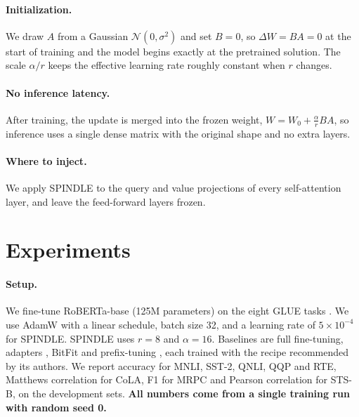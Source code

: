 \documentclass[10pt]{article}
\begin{document}
\paragraph{Initialization.} We draw $A$ from a Gaussian $\mathcal{N}(0, \sigma^2)$ and set $B = 0$, so $\Delta W = BA = 0$ at the start of training and the model begins exactly at the pretrained solution. The scale $\alpha / r$ keeps the effective learning rate roughly constant when $r$ changes.

\paragraph{No inference latency.} After training, the update is merged into the frozen weight, $W = W_0 + \frac{\alpha}{r}BA$, so inference uses a single dense matrix with the original shape and no extra layers.

\paragraph{Where to inject.} We apply SPINDLE to the query and value projections of every self-attention layer, and leave the feed-forward layers frozen.

\section{Experiments}
\label{sec:experiments}
\paragraph{Setup.} We fine-tune RoBERTa-base \citep{roberta} (125M parameters) on the eight GLUE tasks \citep{glue}. We use AdamW \citep{adamw} with a linear schedule, batch size 32, and a learning rate of $5\times10^{-4}$ for SPINDLE. SPINDLE uses $r = 8$ and $\alpha = 16$. Baselines are full fine-tuning, adapters \citep{houlsby}, BitFit \citep{bitfit} and prefix-tuning \citep{prefix}, each trained with the recipe recommended by its authors. We report accuracy for MNLI, SST-2, QNLI, QQP and RTE, Matthews correlation for CoLA, F1 for MRPC and Pearson correlation for STS-B, on the development sets. \textbf{All numbers come from a single training run with random seed 0.}
\end{document}
